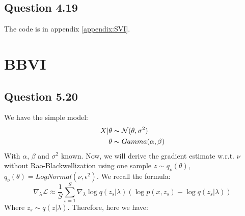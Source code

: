 \documentclass{article}
\begin{document}
\subsection{Question 4.19}
The code is in appendix \ref{appendix:SVI}.

\section{BBVI}

\subsection{Question 5.20}
We have the simple model:
\begin{equation}
    \begin{split}
        X|\theta & \thicksim \mathcal{N}(\theta, \sigma^2) \\
        \theta   & \thicksim Gamma(\alpha, \beta)
    \end{split}
\end{equation}
With $\alpha$, $\beta$ and $\sigma^2$ known.
Now, we will derive the gradient estimate w.r.t. $\nu$ without Rao-Blackwellization using one sample $z \sim q_\nu(\theta)$, $q_\nu(\theta) = LogNormal(\nu, \epsilon^2)$. We recall the formula:
\begin{equation}
    \nabla_\lambda\mathcal{L} \approx \frac{1}{S}\sum_{s=1}^{S}\nabla_\lambda \log q(z_s|\lambda) \left(\log p(x, z_s) - \log q(z_s|\lambda)\right)
\end{equation}
Where $z_s \sim q(z|\lambda)$. Therefore, here we have:
\end{document}
